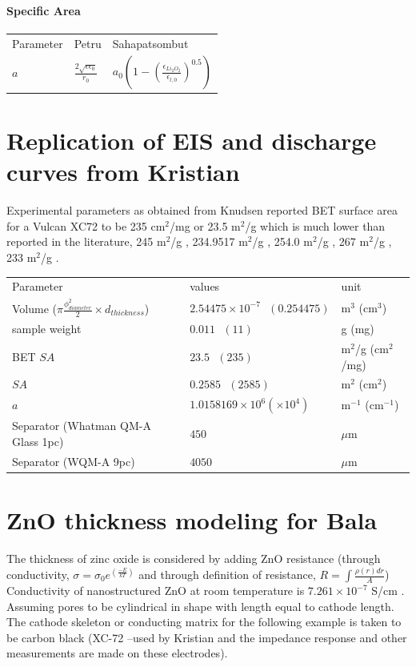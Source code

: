 \documentclass[12pt]{book}
\begin{document}
\paragraph{Specific Area}
\begin{center}
	\begin{tabular}{|l l l|}
		\hline		
           Parameter &  Petru & Sahapatsombut \\
		$a$  & $\frac{2\sqrt{\epsilon\epsilon_0}}{r_0}$ & $a_0\left(1-\left(\frac{\epsilon_{Li_2O_2}}{\epsilon_{l,0}}\right)^{0.5}\right)$ 	\\					
		\hline
	\end{tabular}
\end{center}
\section{Replication of EIS and discharge curves from Kristian}
Experimental parameters as obtained from \cite{Knudsen2016}
Knudsen reported BET surface area for a Vulcan XC72 to be 235 cm$^2$/mg or 23.5 m$^2$/g which is  much lower than reported in the literature, 245 m$^2$/g \cite{Pantea2003}, 234.9517 m$^2$/g \cite{Lee2006}, 254.0 m$^2$/g \cite{Pantea2001}, 267 m$^2$/g \cite{Yang2004}, 233 m$^2$/g \cite{Gunasekara2015}.
\begin{center}
	\begin{tabular}{|l l l|}
		\hline		
           Parameter &  values & unit  \\
           Volume ($\pi \frac{\phi^2_{diameter}}{2}\times d_{thickness}$) &
           
           
           $2.54475\times 10^{-7} \textrm{ }(0.254475)$ & m$^3$ (cm$^3$)\\
           sample weight & $0.011\textrm{ }(11)$ & g (mg) \\
           BET $SA$   & $23.5\textrm{ }(235)$ &	m$^2$/g (cm$^2$/mg) \\
           $SA$   & $0.2585\textrm{ }(2585)$ &	m$^2$ (cm$^2$) \\           
           $a$  & $1.0158169\times 10^{6}  (\times 10^{4})$ & m$^{-1}$ (cm$^{-1}$) 	\\
           Separator (Whatman QM-A Glass 1pc) & $450$& $\mu$m \\
           Separator (WQM-A 9pc) & $4050$&  $\mu$m\\
           
		\hline
	\end{tabular}
\end{center}
\section{ZnO thickness modeling for Bala}
The thickness of zinc oxide is considered by adding ZnO resistance (through conductivity, $\sigma = \sigma_0e^{\left(\frac{-E}{kT}\right)}$ and through definition of resistance, $R=\int\frac{\rho(r)dr}{A}$) Conductivity of nanostructured ZnO at room temperature is $7.261\times 10^{-7}$ S/cm \cite{Caglar2009}. Assuming pores to be cylindrical in shape with length equal to cathode length.  The cathode skeleton or conducting matrix for the following example is taken to be carbon black (XC-72 --used by Kristian and the impedance response and other measurements are made on these electrodes). 
\end{document}
